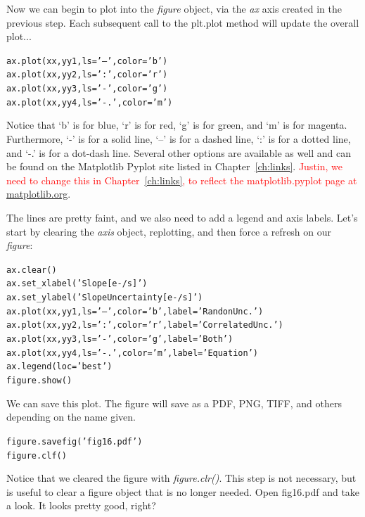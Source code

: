 Now we can begin to plot into the \textit{figure} object, via the \textit{ax} 
axis created in the previous step. Each subsequent call to the plt.plot 
method will update the overall plot... 

\begin{alltt}
  \pytab ax.plot(xx, yy1, ls='--', color='b')
  \pytab ax.plot(xx, yy2, ls=':', color='r')
  \pytab ax.plot(xx, yy3, ls='-', color='g')
  \pytab ax.plot(xx, yy4, ls='-.', color='m')
\end{alltt}

Notice that `b' is for blue, `r' is for red, `g' is for green, and `m'
is for magenta.  Furthermore, `-' is for a solid line, `--' is for a
dashed line, `:' is for a dotted line, and `-.' is for a dot-dash
line.  Several other options are available as well and can be found on
the Matplotlib Pyplot site listed in Chapter~\ref{ch:links}. 
\textcolor{red}{Justin, we need to change this in Chapter~\ref{ch:links}, 
to reflect the matplotlib.pyplot page at } 
\href{http://matplotlib.org/api/pyplot_summary.html}{matplotlib.org}.

The lines are pretty faint, and we also need to add a legend and axis
labels. Let's start by clearing the \textit{axis} object, replotting, and then 
force a refresh on our \textit{figure}:

\begin{alltt}
  \pytab ax.clear()
  \pytab ax.set_xlabel('Slope [e-/s]')
  \pytab ax.set_ylabel('Slope Uncertainty [e-/s]')
  \pytab ax.plot(xx, yy1, ls='--', color='b', label='Randon Unc.')
  \pytab ax.plot(xx, yy2, ls=':', color='r', label='Correlated Unc.')
  \pytab ax.plot(xx, yy3, ls='-', color='g', label='Both')
  \pytab ax.plot(xx, yy4, ls='-.', color='m', label='Equation')
  \pytab ax.legend(loc='best')
  \pytab figure.show()
\end{alltt}

We can save this plot.  The figure will save as a PDF, PNG, TIFF, and
others depending on the name given.

\begin{alltt}
  \pytab figure.savefig('fig16.pdf')
  \pytab figure.clf()
\end{alltt}

Notice that we cleared the figure with \textit{figure.clr()}. This step is not 
necessary, but is useful to clear a figure object that is no longer needed. 
Open fig16.pdf and take a look.  It looks pretty good, right?

